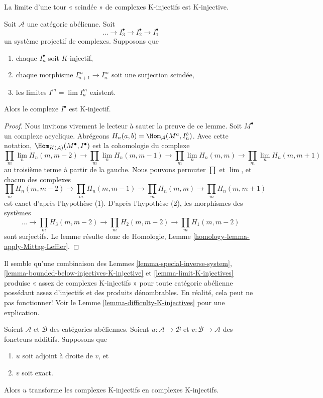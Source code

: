\begin{lemma}
\label{lemma-limit-K-injectives}
\begin{slogan}
La limite d'une tour « scindée » de complexes K-injectifs est K-injective.
\end{slogan}
Soit $\mathcal{A}$ une catégorie abélienne. Soit
$$
\ldots \to I_3^\bullet \to I_2^\bullet \to I_1^\bullet
$$
un système projectif de complexes. Supposons que
\begin{enumerate}
\item chaque $I_n^\bullet$ soit $K$-injectif,
\item chaque morphisme $I_{n + 1}^m \to I_n^m$ soit une surjection scindée,
\item les limites $I^m = \lim I_n^m$ existent.
\end{enumerate}
Alors le complexe $I^\bullet$ est K-injectif.
\end{lemma}

\begin{proof}
Nous invitons vivement le lecteur à sauter la preuve de ce lemme.
Soit $M^\bullet$ un complexe acyclique. Abrégeons
$H_n(a, b) = \Hom_\mathcal{A}(M^a, I_n^b)$. Avec cette notation,
$\Hom_{K(\mathcal{A})}(M^\bullet, I^\bullet)$ est la cohomologie du complexe
$$
\prod_m \lim\limits_n H_n(m, m - 2)
\to
\prod_m \lim\limits_n H_n(m, m - 1)
\to
\prod_m \lim\limits_n H_n(m, m)
\to
\prod_m \lim\limits_n H_n(m, m + 1)
$$
au troisième terme à partir de la gauche.
Nous pouvons permuter $\prod$ et $\lim$, et chacun des complexes
$$
\prod_m H_n(m, m - 2)
\to
\prod_m H_n(m, m - 1)
\to
\prod_m H_n(m, m)
\to
\prod_m H_n(m, m + 1)
$$
est exact d'après l'hypothèse (1). D'après l'hypothèse (2), les morphismes
des systèmes
$$
\ldots \to
\prod_m H_3(m, m - 2) \to
\prod_m H_2(m, m - 2) \to
\prod_m H_1(m, m - 2)
$$
sont surjectifs. Le lemme résulte donc de
Homologie, Lemme \ref{homology-lemma-apply-Mittag-Leffler}.
\end{proof}

\noindent
Il semble qu'une combinaison des Lemmes \ref{lemma-special-inverse-system},
\ref{lemma-bounded-below-injectives-K-injective} et
\ref{lemma-limit-K-injectives} produise « assez de complexes K-injectifs »
pour toute catégorie abélienne possédant assez d'injectifs et des produits
dénombrables. En réalité, cela peut ne pas fonctionner! Voir le
Lemme \ref{lemma-difficulty-K-injectives} pour une explication.

\begin{lemma}
\label{lemma-adjoint-preserve-K-injectives}
Soient $\mathcal{A}$ et $\mathcal{B}$ des catégories abéliennes.
Soient $u : \mathcal{A} \to \mathcal{B}$ et
$v : \mathcal{B} \to \mathcal{A}$ des foncteurs additifs. Supposons que
\begin{enumerate}
\item $u$ soit adjoint à droite de $v$, et
\item $v$ soit exact.
\end{enumerate}
Alors $u$ transforme les complexes K-injectifs en complexes K-injectifs.
\end{lemma}


